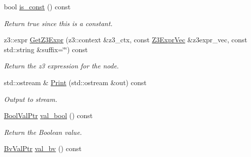 \begin{DoxyCompactItemize}
\mbox{\label{classilang_1_1_expr_const_a2b955a367ed585f83aef9a3908b15de4}} 
bool \mbox{\hyperlink{classilang_1_1_expr_const_a2b955a367ed585f83aef9a3908b15de4}{is\+\_\+const}} () const
\begin{DoxyCompactList}\small\item\em Return true since this is a constant. \end{DoxyCompactList}\item 
\mbox{\label{classilang_1_1_expr_const_aeed0933012a126d9d7a252af358703f4}} 
z3\+::expr \mbox{\hyperlink{classilang_1_1_expr_const_aeed0933012a126d9d7a252af358703f4}{Get\+Z3\+Expr}} (z3\+::context \&z3\+\_\+ctx, const \mbox{\hyperlink{namespaceilang_adc4eee919aa24fff882d03a48d733c19}{Z3\+Expr\+Vec}} \&z3expr\+\_\+vec, const std\+::string \&suffix=\char`\"{}\char`\"{}) const
\begin{DoxyCompactList}\small\item\em Return the z3 expression for the node. \end{DoxyCompactList}\item 
\mbox{\label{classilang_1_1_expr_const_ac9d282667ed9d00a9145d9348531c698}} 
std\+::ostream \& \mbox{\hyperlink{classilang_1_1_expr_const_ac9d282667ed9d00a9145d9348531c698}{Print}} (std\+::ostream \&out) const
\begin{DoxyCompactList}\small\item\em Output to stream. \end{DoxyCompactList}\item 
\mbox{\label{classilang_1_1_expr_const_aae802f3acbc48c9ca5f0b10f2e2a7d2b}} 
\mbox{\hyperlink{namespaceilang_a8dabeb8fdac011892c311e074696b570}{Bool\+Val\+Ptr}} \mbox{\hyperlink{classilang_1_1_expr_const_aae802f3acbc48c9ca5f0b10f2e2a7d2b}{val\+\_\+bool}} () const
\begin{DoxyCompactList}\small\item\em Return the Boolean value. \end{DoxyCompactList}\item 
\mbox{\label{classilang_1_1_expr_const_ac9e64cfc5e54667ebcbf38a104fc1635}} 
\mbox{\hyperlink{namespaceilang_a6a892f6286748cb7548429984d840752}{Bv\+Val\+Ptr}} \mbox{\hyperlink{classilang_1_1_expr_const_ac9e64cfc5e54667ebcbf38a104fc1635}{val\+\_\+bv}} () const

\end{DoxyCompactItemize}
